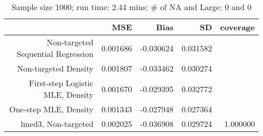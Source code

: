 \begin{table}[ht]
\centering
\caption{Sample size 1000; run time: 2.44 mins; # of NA and Large:  0 and 0} 
\begin{tabular}{rrrrr}
  \hline
 & MSE & Bias & SD & coverage \\ 
  \hline
Non-targeted Sequential Regression & 0.001686 & -0.030624 & 0.031582 &  \\ 
  Non-targeted Density & 0.001807 & -0.033462 & 0.030274 &  \\ 
  First-step Logistic MLE, Density & 0.001670 & -0.029395 & 0.032772 &  \\ 
  One-step MLE, Density & 0.001343 & -0.027948 & 0.027364 &  \\ 
  lmed3, Non-targeted & 0.002025 & -0.036908 & 0.029724 & 1.000000 \\ 
   \hline
\end{tabular}
\end{table}
